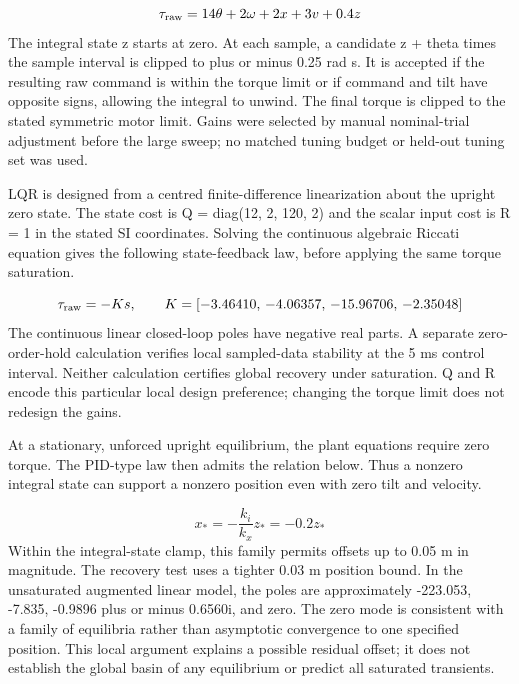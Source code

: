 \documentclass[11pt,a4paper]{article}
\begin{document}
\begin{equation}\tau_{\rm raw}=14\theta+2\omega+2x+3v+0.4z\end{equation}
The integral state z starts at zero. At each sample, a candidate z + theta times the sample interval is clipped to plus or minus 0.25 rad s. It is accepted if the resulting raw command is within the torque limit or if command and tilt have opposite signs, allowing the integral to unwind. The final torque is clipped to the stated symmetric motor limit. Gains were selected by manual nominal-trial adjustment before the large sweep; no matched tuning budget or held-out tuning set was used.

LQR is designed from a centred finite-difference linearization about the upright zero state. The state cost is Q = diag(12, 2, 120, 2) and the scalar input cost is R = 1 in the stated SI coordinates. Solving the continuous algebraic Riccati equation gives the following state-feedback law, before applying the same torque saturation.

\begin{equation}\tau_{\rm raw}=-Ks,\qquad K=[-3.46410,\,-4.06357,\,-15.96706,\,-2.35048]\end{equation}
The continuous linear closed-loop poles have negative real parts. A separate zero-order-hold calculation verifies local sampled-data stability at the 5 ms control interval. Neither calculation certifies global recovery under saturation. Q and R encode this particular local design preference; changing the torque limit does not redesign the gains.

At a stationary, unforced upright equilibrium, the plant equations require zero torque. The PID-type law then admits the relation below. Thus a nonzero integral state can support a nonzero position even with zero tilt and velocity.

\begin{equation}x_*=-\frac{k_i}{k_x}z_*=-0.2z_*\end{equation}
Within the integral-state clamp, this family permits offsets up to 0.05 m in magnitude. The recovery test uses a tighter 0.03 m position bound. In the unsaturated augmented linear model, the poles are approximately -223.053, -7.835, -0.9896 plus or minus 0.6560i, and zero. The zero mode is consistent with a family of equilibria rather than asymptotic convergence to one specified position. This local argument explains a possible residual offset; it does not establish the global basin of any equilibrium or predict all saturated transients.
\end{document}
